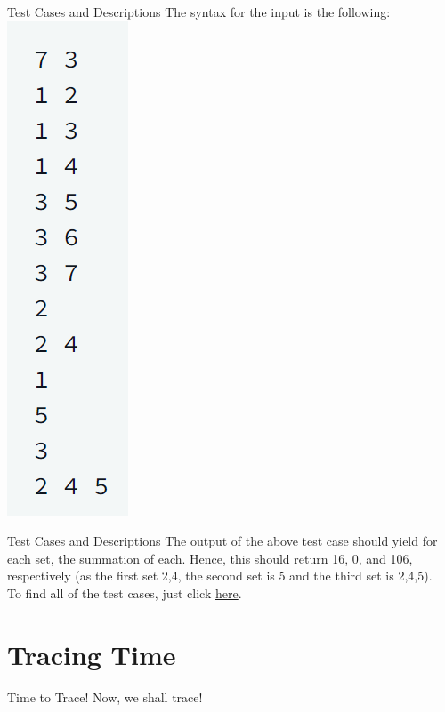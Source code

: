 \documentclass{beamer}
\begin{document}
\begin{frame}{Test Cases and Descriptions}
The syntax for the input is the following:
\\
\includegraphics[scale=.7]{inputkitty01.PNG} 
\end{frame}

\begin{frame}{Test Cases and Descriptions}
The output of the above test case should yield for each set, the summation of each. Hence, this should return 16, 0, and 106, respectively (as the first set {2,4}, the second set is {5} and the third set is {2,4,5}).
\\To find all of the test cases, just click \href{https://github.com/conniexu444/kittyscalculationstestcases}{\color{blue}here}.
\end{frame}

\section{Tracing Time}
\begin{frame}{Time to Trace!}
Now, we shall trace!
\end{frame}
\end{document}
